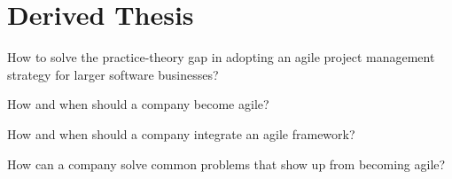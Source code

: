 % 
\section*{Derived Thesis}

How to solve the practice-theory gap in adopting an agile project management strategy for larger software businesses?

How and when should a company become agile?

How and when should a company integrate an agile framework?

How can a company solve common problems that show up from becoming agile?